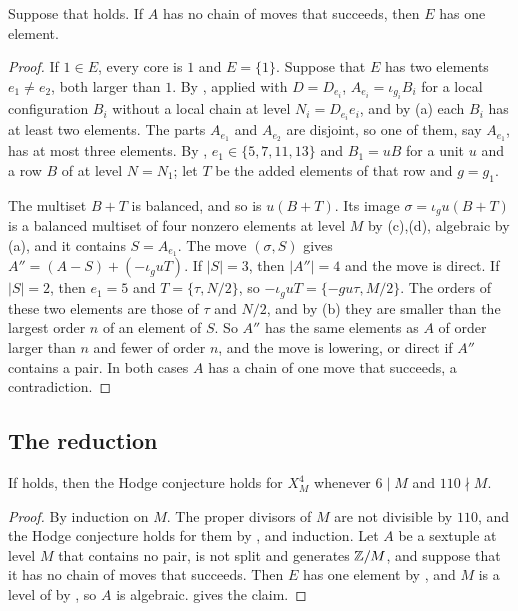 \begin{proposition}\label{prop:twocores}
Suppose that  holds. If $A$ has no chain of moves that
succeeds, then $E$ has one element.
\end{proposition}

\begin{proof}
If $1\in E$, every core is $1$ and $E=\{1\}$. Suppose that $E$ has two
elements $e_{1}\ne e_{2}$, both larger than $1$. By , applied
with $D=D_{e_{i}}$, $A_{e_{i}}=\iota_{g_{i}}B_{i}$ for a local configuration
$B_{i}$ without a local chain at level $N_{i}=D_{e_{i}}e_{i}$, and by
(a) each $B_{i}$ has at least two elements. The parts $A_{e_{1}}$
and $A_{e_{2}}$ are disjoint, so one of them, say $A_{e_{1}}$, has at most
three elements. By , $e_{1}\in\{5,7,11,13\}$ and $B_{1}=uB$ for a
unit $u$ and a row $B$ of  at level $N=N_{1}$; let $T$ be the
added elements of that row and $g=g_{1}$.

The multiset $B+T$ is balanced, and so is $u(B+T)$. Its image
$\sigma=\iota_{g}u(B+T)$ is a balanced multiset of four nonzero elements at
level $M$ by (c),(d), algebraic by
(a), and it contains $S=A_{e_{1}}$. The move $(\sigma,S)$
gives $A''=(A-S)+(-\iota_{g}uT)$. If $|S|=3$, then $|A''|=4$ and the move is
direct. If $|S|=2$, then $e_{1}=5$ and $T=\{\tau,N/2\}$, so
$-\iota_{g}uT=\{-gu\tau,M/2\}$. The orders of these two elements are those of
$\tau$ and $N/2$, and by (b) they are smaller than the largest
order $n$ of an element of $S$. So $A''$ has the same elements as $A$ of
order larger than $n$ and fewer of order $n$, and the move is lowering, or
direct if $A''$ contains a pair. In both cases $A$ has a chain of
one move that succeeds, a contradiction.
\end{proof}

\subsection{The reduction}

\begin{theorem}\label{thm:six}
If  holds, then the Hodge conjecture holds for $X^{4}_{M}$
whenever $6\mid M$ and $110\nmid M$.
\end{theorem}

\begin{proof}
By induction on $M$. The proper divisors of $M$ are not divisible by $110$,
and the Hodge conjecture holds for them by ,
 and induction. Let $A$ be a sextuple at level $M$ that contains
no pair, is not split and generates $\mathbb{Z}/M$, and suppose that it has no chain
of moves that succeeds. Then $E$ has one element by ,
and $M$ is a level of  by , so $A$ is
algebraic.  gives the claim.
\end{proof}



